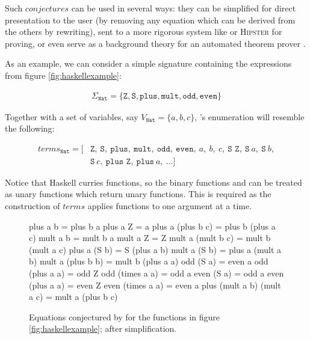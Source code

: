 Such $conjectures$ can be used in several ways: they can be simplified for direct presentation to the user (by removing any equation which can be derived from the others by rewriting), sent to a more rigorous system like \hspec{} or \textsc{Hipster} for proving, or even serve as a background theory for an automated theorem prover \citep{claessen2013automating}.

As an example, we can consider a simple signature containing the expressions from figure \ref{fig:haskellexample}:

\begin{align*}
  \Sigma_{\texttt{Nat}} = \{\texttt{Z}, \texttt{S}, \texttt{plus}, \texttt{mult}, \texttt{odd}, \texttt{even}\}
\end{align*}

Together with a set of variables, say $V_{\texttt{Nat}} = \{a, b, c\}$, \qspec{}'s enumeration will resemble the following:

\begin{align*}
  terms_{\texttt{Nat}} = [& \texttt{Z},\ \texttt{S},\ \texttt{plus},\ \texttt{mult},\ \texttt{odd},\ \texttt{even},\ a,\ b,\ c,\ \texttt{S Z},\ \texttt{S}\ a,\ \texttt{S}\ b, \\
                     & \texttt{S}\ c,\ \texttt{plus Z},\ \texttt{plus}\ a,\ \dots ]
\end{align*}

Notice that Haskell curries functions, so the binary functions  and  can be treated as unary functions which return unary functions. This is required as the construction of $terms$ applies functions to one argument at a time.

\begin{figure}
  \begin{haskell}
                  plus a b = plus b a
                  plus a Z = a
         plus a (plus b c) = plus b (plus a c)
                  mult a b = mult b a
                  mult a Z = Z
         mult a (mult b c) = mult b (mult a c)
              plus a (S b) = S (plus a b)
              mult a (S b) = plus a (mult a b)
         mult a (plus b b) = mult b (plus a a)
                 odd (S a) = even a
            odd (plus a a) = odd Z
           odd (times a a) = odd a
                even (S a) = odd a
           even (plus a a) = even Z
          even (times a a) = even a
plus (mult a b) (mult a c) = mult a (plus b c)
  \end{haskell}
  \caption{Equations conjectured by \qspec{} for the functions in figure \ref{fig:haskellexample}; after simplification.}
  \label{fig:qspecresult}
\end{figure}

